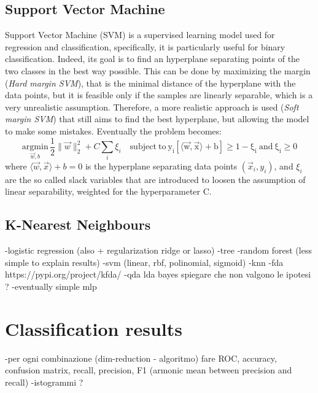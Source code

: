 \documentclass[letterpaper]{article}
\begin{document}
	\subsection{Support Vector Machine}
	Support Vector Machine (SVM) is a supervised learning model used for regression and classification, specifically, it is particularly useful for binary classification. Indeed, its goal is to find an hyperplane separating points of the two classes in the best way possible. This can be done by maximizing the margin (\emph{Hard margin SVM}), that is the minimal distance of the hyperplane with the data points, but it is feasible only if the samples are linearly separable, which is a very unrealistic assumption. Therefore, a more realistic approach is used (\emph{Soft margin SVM}) that still aims to find the best hyperplane, but allowing the model to make some mistakes. Eventually the problem becomes:
	\begin{equation}
		\underset{\vec{w}, b}{\mathrm{argmin}}\, \frac{1}{2}\lVert\vec{w}\rVert_2^2 + C\sum_{i}\xi_i \quad \mathrm{subject\ to\ y_i[\langle\vec{w},\vec{x}\rangle+b]\ge1-\xi_i \mathrm{\ and\ } \xi_i\ge0}
	\end{equation}
	where $\langle\vec{w},\vec{x}\rangle+b = 0$ is the hyperplane separating data points $(\vec{x}_i,y_i)$, and $\xi_i$ are the so called slack variables that are introduced to loosen the assumption of linear separability, weighted for the hyperparameter C.
	\subsection{K-Nearest Neighbours}
	
	-logistic regression (also + regularization ridge or lasso)
	-tree
	-random forest (less simple to explain results)
	-svm (linear, rbf, polinomial, sigmoid)
	-knn
	-fda https://pypi.org/project/kfda/
	-qda lda bayes spiegare che non valgono le ipotesi ?
	-eventually simple mlp
	
	\section{Classification results}
	-per ogni combinazione (dim-reduction - algoritmo) fare ROC, accuracy, confusion matrix, recall, precision, F1 (armonic mean between precision and recall)
	-istogrammi ? 
	
	
	
	\newpage
	\printbibliography
	\nocite{MohriRostamizadehTalwalkar18}
	\nocite{understandingml}
	
	
\end{document}
